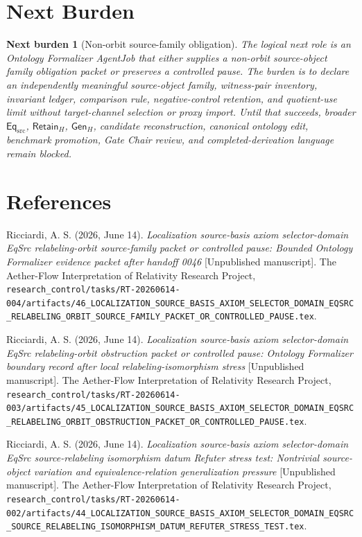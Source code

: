 \documentclass[11pt]{article}
\newcommand{\EqSrc}{\mathsf{Eq}_{\mathrm{src}}}
\newcommand{\GenH}{\mathsf{Gen}_{H}}
\newcommand{\RetainH}{\mathsf{Retain}_{H}}
\newtheorem{nextburden}{Next burden}
\begin{document}
\section{Next Burden}

\begin{nextburden}[Non-orbit source-family obligation]
The logical next role is an Ontology Formalizer AgentJob that either
supplies a non-orbit source-object family obligation packet or preserves a
controlled pause. The burden is to declare an independently meaningful
source-object family, witness-pair inventory, invariant ledger,
comparison rule, negative-control retention, and quotient-use limit
without target-channel selection or proxy import. Until that succeeds,
broader \(\EqSrc\), \(\RetainH\), \(\GenH\), candidate reconstruction,
canonical ontology edit, benchmark promotion, Gate Chair review, and
completed-derivation language remain blocked.
\end{nextburden}

\section*{References}

Ricciardi, A. S. (2026, June 14). \emph{Localization source-basis axiom
selector-domain EqSrc relabeling-orbit source-family packet or controlled
pause: Bounded Ontology Formalizer evidence packet after handoff 0046}
[Unpublished manuscript]. The Aether-Flow Interpretation of Relativity
Research Project,
\texttt{research\_control/tasks/RT-20260614-004/artifacts/46\_LOCALIZATION\_SOURCE\_BASIS\_AXIOM\_SELECTOR\_DOMAIN\_EQSRC\_RELABELING\_ORBIT\_SOURCE\_FAMILY\_PACKET\_OR\_CONTROLLED\_PAUSE.tex}.

Ricciardi, A. S. (2026, June 14). \emph{Localization source-basis axiom
selector-domain EqSrc relabeling-orbit obstruction packet or controlled
pause: Ontology Formalizer boundary record after local
relabeling-isomorphism stress} [Unpublished manuscript]. The Aether-Flow
Interpretation of Relativity Research Project,
\texttt{research\_control/tasks/RT-20260614-003/artifacts/45\_LOCALIZATION\_SOURCE\_BASIS\_AXIOM\_SELECTOR\_DOMAIN\_EQSRC\_RELABELING\_ORBIT\_OBSTRUCTION\_PACKET\_OR\_CONTROLLED\_PAUSE.tex}.

Ricciardi, A. S. (2026, June 14). \emph{Localization source-basis axiom
selector-domain EqSrc source-relabeling isomorphism datum Refuter stress
test: Nontrivial source-object variation and equivalence-relation
generalization pressure} [Unpublished manuscript]. The Aether-Flow
Interpretation of Relativity Research Project,
\texttt{research\_control/tasks/RT-20260614-002/artifacts/44\_LOCALIZATION\_SOURCE\_BASIS\_AXIOM\_SELECTOR\_DOMAIN\_EQSRC\_SOURCE\_RELABELING\_ISOMORPHISM\_DATUM\_REFUTER\_STRESS\_TEST.tex}.
\end{document}
